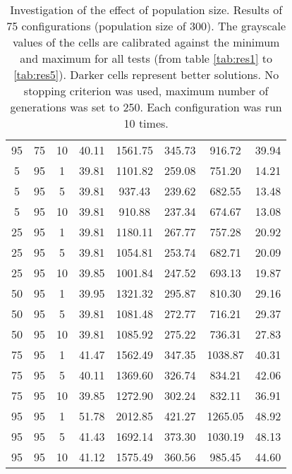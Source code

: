 \begin{table}[h]
\begin{tabular}{ccc|c|c|c|c|c}
95 & 75 & 10 & \cellcolor{gray!48}40.11 & \cellcolor{gray!1}1561.75 & \cellcolor{gray!1}345.73 & \cellcolor{gray!1}916.72 & 39.94\\
5 & 95 & 1 & \cellcolor{gray!50}39.81 & \cellcolor{gray!1}1101.82 & \cellcolor{gray!1}259.08 & \cellcolor{gray!22}751.20 & 14.21\\
5 & 95 & 5 & \cellcolor{gray!50}39.81 & \cellcolor{gray!15}937.43 & \cellcolor{gray!1}239.62 & \cellcolor{gray!44}682.55 & 13.48\\
5 & 95 & 10 & \cellcolor{gray!50}39.81 & \cellcolor{gray!20}910.88 & \cellcolor{gray!1}237.34 & \cellcolor{gray!46}674.67 & 13.08\\
25 & 95 & 1 & \cellcolor{gray!50}39.81 & \cellcolor{gray!1}1180.11 & \cellcolor{gray!1}267.77 & \cellcolor{gray!21}757.28 & 20.92\\
25 & 95 & 5 & \cellcolor{gray!50}39.81 & \cellcolor{gray!1}1054.81 & \cellcolor{gray!1}253.74 & \cellcolor{gray!43}682.71 & 20.09\\
25 & 95 & 10 & \cellcolor{gray!50}39.85 & \cellcolor{gray!4}1001.84 & \cellcolor{gray!1}247.52 & \cellcolor{gray!40}693.13 & 19.87\\
50 & 95 & 1 & \cellcolor{gray!49}39.95 & \cellcolor{gray!1}1321.32 & \cellcolor{gray!1}295.87 & \cellcolor{gray!4}810.30 & 29.16\\
50 & 95 & 5 & \cellcolor{gray!50}39.81 & \cellcolor{gray!1}1081.48 & \cellcolor{gray!1}272.77 & \cellcolor{gray!33}716.21 & 29.37\\
50 & 95 & 10 & \cellcolor{gray!50}39.81 & \cellcolor{gray!1}1085.92 & \cellcolor{gray!1}275.22 & \cellcolor{gray!27}736.31 & 27.83\\
75 & 95 & 1 & \cellcolor{gray!34}41.47 & \cellcolor{gray!1}1562.49 & \cellcolor{gray!1}347.35 & \cellcolor{gray!1}1038.87 & 40.31\\
75 & 95 & 5 & \cellcolor{gray!48}40.11 & \cellcolor{gray!1}1369.60 & \cellcolor{gray!1}326.74 & \cellcolor{gray!1}834.21 & 42.06\\
75 & 95 & 10 & \cellcolor{gray!50}39.85 & \cellcolor{gray!1}1272.90 & \cellcolor{gray!1}302.24 & \cellcolor{gray!1}832.11 & 36.91\\
95 & 95 & 1 & \cellcolor{gray!1}51.78 & \cellcolor{gray!1}2012.85 & \cellcolor{gray!1}421.27 & \cellcolor{gray!1}1265.05 & 48.92\\
95 & 95 & 5 & \cellcolor{gray!34}41.43 & \cellcolor{gray!1}1692.14 & \cellcolor{gray!1}373.30 & \cellcolor{gray!1}1030.19 & 48.13\\
95 & 95 & 10 & \cellcolor{gray!37}41.12 & \cellcolor{gray!1}1575.49 & \cellcolor{gray!1}360.56 & \cellcolor{gray!1}985.45 & 44.60
\end{tabular}
\caption{Investigation of the effect of population size. Results of 75 configurations (population size of 300). The grayscale values of the cells are calibrated against the minimum and maximum for all tests (from table \ref{tab:res1} to \ref{tab:res5}). Darker cells represent better solutions. No stopping criterion was used, maximum number of generations was set to 250. Each configuration was run 10 times.}
\label{tab:res2}
\end{table}

